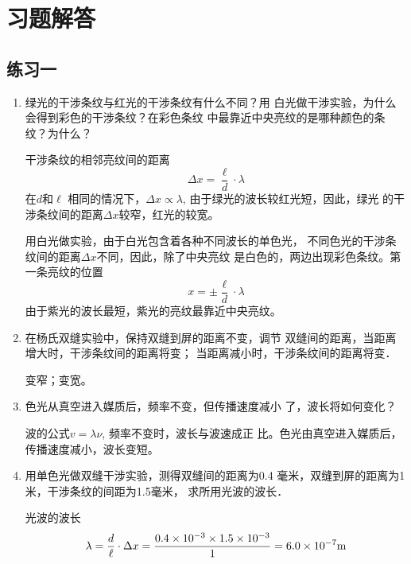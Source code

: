 \section{习题解答}
\subsection{练习一}

\begin{enumerate}
\item 绿光的干涉条纹与红光的干涉条纹有什么不同？用
白光做干涉实验，为什么会得到彩色的干涉条纹？在彩色条纹
中最靠近中央亮纹的是哪种颜色的条纹？为什么？


\begin{solution}
干涉条纹的相邻亮纹间的距离
\[\Delta x=\frac{\ell}{d}\cdot \lambda\]
在$d$和$\ell$
相同的情况下，$\Delta x\propto \lambda$, 由于绿光的波长较红光短，因此，绿光
的干涉条纹间的距离$\Delta x$较窄，红光的较宽。

用白光做实验，由于白光包含着各种不同波长的单色光，
不同色光的干涉条纹间的距离$\Delta x$不同，因此，除了中央亮纹
是白色的，两边出现彩色条纹。第一条亮纹的位置
\[x=\pm\frac{\ell}{d}\cdot \lambda\]
由于紫光的波长最短，紫光的亮纹最靠近中央亮纹。
\end{solution}

\item 在杨氏双缝实验中，保持双缝到屏的距离不变，调节
双缝间的距离，当距离增大时，干涉条纹间的距离将变\underline{\qquad}；
当距离减小时，干涉条纹间的距离将变\underline{\qquad}．


\begin{solution}
    变窄；变宽。
\end{solution}

\item 色光从真空进入媒质后，频率不变，但传播速度减小
了，波长将如何变化？


\begin{solution}
    波的公式$v=\lambda\nu$, 频率不变时，波长与波速成正
    比。色光由真空进入媒质后，传播速度减小，波长变短。
\end{solution}

\item 用单色光做双缝干涉实验，测得双缝间的距离为0.4
毫米，双缝到屏的距离为1米，干涉条纹的间距为1.5毫米，
求所用光波的波长．


\begin{solution}
    光波的波长
\[\lambda=\frac{d}{\ell}\cdot \Delta x=\frac{0.4\times 10^{-3}\times 1.5\times 10^{-3}}{1}=6.0\times 10^{-7}{\rm m}\]
\end{solution}


\end{enumerate}
